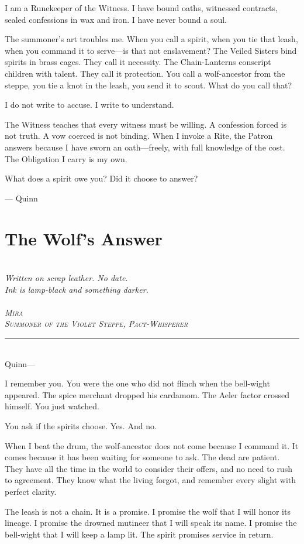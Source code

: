 \documentclass[11pt,twoside]{book}
\newcommand{\sealdecor}{%
  \begin{center}\textcolor{sealcolor}{\faStamp}\end{center}}
\newcommand{\letter}[4]{%
  \begin{center}
    \itshape
    \textcolor{sealcolor}{\faEnvelope}\\[0.2cm]
    \small #1\\[0.1cm]
    \small #2\\[0.1cm]
    \textcolor{sealcolor}{\faStamp}\\[0.3cm]
    \scshape #3\\[0.1cm]
    \itshape #4\\[0.5cm]
  \end{center}
  \noindent\rule{\textwidth}{0.3pt}\\[0.3cm]
}
\begin{document}
I am a Runekeeper of the Witness. I have bound oaths, witnessed contracts, sealed confessions in wax and iron. I have never bound a soul.

The summoner's art troubles me. When you call a spirit, when you tie that leash, when you command it to serve---is that not enslavement? The Veiled Sisters bind spirits in brass cages. They call it necessity. The Chain-Lanterns conscript children with talent. They call it protection. You call a wolf-ancestor from the steppe, you tie a knot in the leash, you send it to scout. What do you call that?

I do not write to accuse. I write to understand.

The Witness teaches that every witness must be willing. A confession forced is not truth. A vow coerced is not binding. When I invoke a Rite, the Patron answers because I have sworn an oath---freely, with full knowledge of the cost. The Obligation I carry is my own.

What does a spirit owe you? Did it choose to answer?

\vspace{0.5em}
\noindent\hfill --- Quinn

\sealdecor

\chapter{The Wolf's Answer}
\letter
  {Written on scrap leather. No date.}
  {Ink is lamp-black and something darker.}
  {Mira}{Summoner of the Violet Steppe, Pact-Whisperer}

Quinn---

I remember you. You were the one who did not flinch when the bell-wight appeared. The spice merchant dropped his cardamom. The Aeler factor crossed himself. You just watched.

You ask if the spirits choose. Yes. And no.

When I beat the drum, the wolf-ancestor does not come because I command it. It comes because it has been waiting for someone to ask. The dead are patient. They have all the time in the world to consider their offers, and no need to rush to agreement. They know what the living forgot, and remember every slight with perfect clarity.

The leash is not a chain. It is a promise. I promise the wolf that I will honor its lineage. I promise the drowned mutineer that I will speak its name. I promise the bell-wight that I will keep a lamp lit. The spirit promises service in return.
\end{document}
